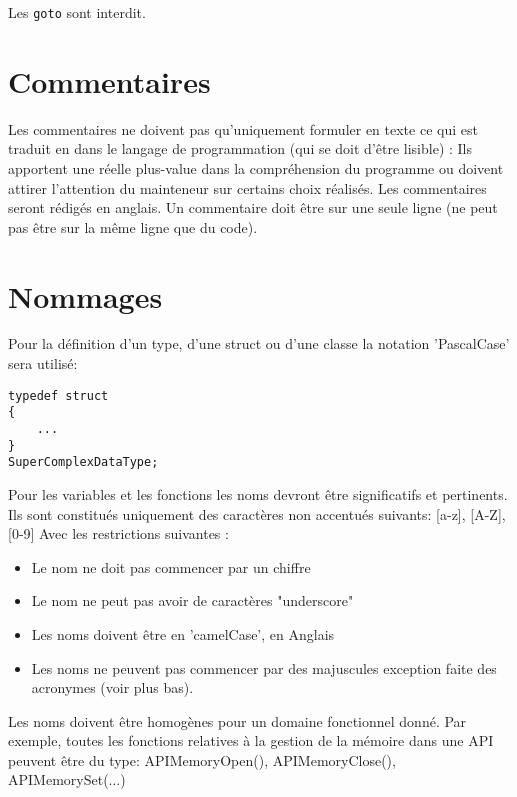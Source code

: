 Les \texttt{goto} sont interdit.

\section{Commentaires}
Les commentaires ne doivent pas qu’uniquement formuler en texte ce qui est traduit 
en dans le langage de programmation (qui se doit d'être lisible) : \newline 
Ils apportent une réelle plus-value dans la compréhension du programme ou doivent
attirer l’attention du mainteneur sur certains choix réalisés. Les commentaires seront 
rédigés en anglais. \newline
Un commentaire doit être sur une seule ligne (ne peut pas être sur la même ligne 
que du code).
 
\section{Nommages}
Pour la définition d'un type, d'une struct ou d'une classe la notation 'PascalCase'
sera utilisé: 
\begin{verbatim}
typedef struct 
{
    ...
}
SuperComplexDataType;
\end{verbatim}

Pour les variables et les fonctions les noms devront être significatifs et 
pertinents.\newline
Ils sont constitués uniquement des caractères non accentués suivants: 
[a-z], [A-Z], [0-9]\newline
Avec les restrictions suivantes :
\begin{itemize}
	\item Le nom ne doit pas commencer par un chiffre
	\item Le nom ne peut pas avoir de caractères "underscore"
	\item Les noms doivent être en 'camelCase', en Anglais
	\item Les noms ne peuvent pas commencer par des majuscules exception faite
          des acronymes (voir plus bas).
\end{itemize}
Les noms doivent être homogènes pour un domaine fonctionnel donné. Par exemple, 
toutes les fonctions relatives à la gestion de la mémoire dans une API peuvent 
être du type: \newline 
APIMemoryOpen(), APIMemoryClose(), APIMemorySet(...)

